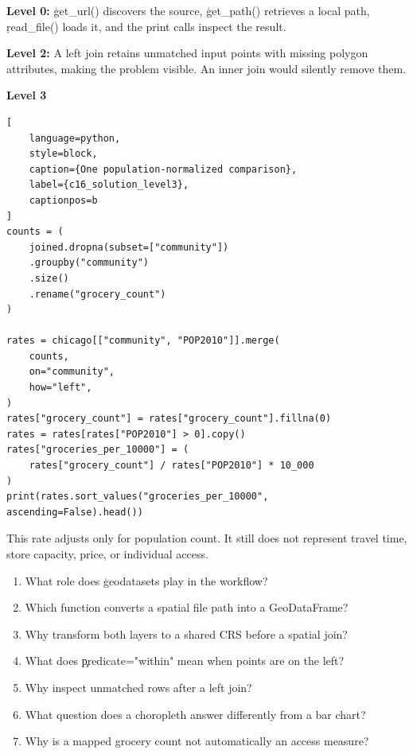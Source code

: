 
\textbf{Level 0:} \c{get_url()} discovers the source, \c{get_path()} retrieves a
local path, \c{read_file()} loads it, and the print calls inspect the result.

\textbf{Level 2:} A left join retains unmatched input points with missing polygon
attributes, making the problem visible. An inner join would silently remove them.

\textbf{Level 3}

\begin{lstlisting}[
    language=python,
    style=block,
    caption={One population-normalized comparison},
    label={c16_solution_level3},
    captionpos=b
]
counts = (
    joined.dropna(subset=["community"])
    .groupby("community")
    .size()
    .rename("grocery_count")
)

rates = chicago[["community", "POP2010"]].merge(
    counts,
    on="community",
    how="left",
)
rates["grocery_count"] = rates["grocery_count"].fillna(0)
rates = rates[rates["POP2010"] > 0].copy()
rates["groceries_per_10000"] = (
    rates["grocery_count"] / rates["POP2010"] * 10_000
)
print(rates.sort_values("groceries_per_10000", ascending=False).head())
\end{lstlisting}

This rate adjusts only for population count. It still does not represent travel
time, store capacity, price, or individual access.


\begin{enumerate}
    \item What role does \c{geodatasets} play in the workflow?
    \item Which function converts a spatial file path into a GeoDataFrame?
    \item Why transform both layers to a shared CRS before a spatial join?
    \item What does \c{predicate="within"} mean when points are on the left?
    \item Why inspect unmatched rows after a left join?
    \item What question does a choropleth answer differently from a bar chart?
    \item Why is a mapped grocery count not automatically an access measure?
\end{enumerate}


